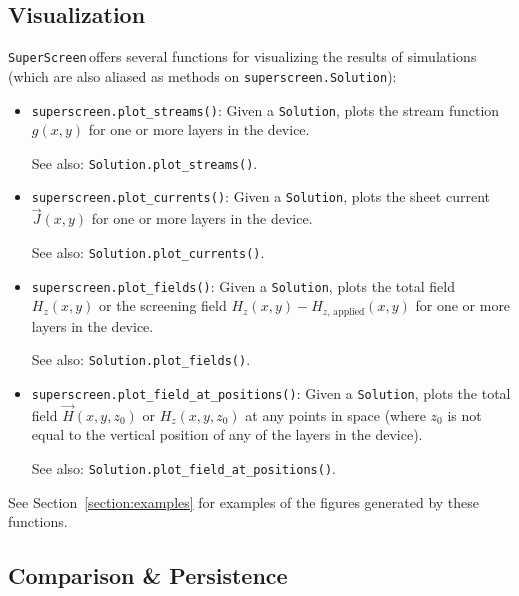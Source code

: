 \documentclass[preprint,12pt]{elsarticle}
\newcommand{\SuperScreen}{\texttt{SuperScreen}\,}
\begin{document}
\subsection{Visualization}
\label{section:overview:visualization}

\SuperScreen offers several functions for visualizing the results of simulations (which are also aliased as methods on \texttt{superscreen.Solution}):

\begin{itemize}
    \item{
    \texttt{superscreen.plot_streams()}: Given a \texttt{Solution}, plots the stream function $g(x, y)$ for one or more layers in the device.
    
    See also: \texttt{Solution.plot_streams()}.
    }
    \item{
    \texttt{superscreen.plot_currents()}: Given a \texttt{Solution}, plots the sheet current $\vec{J}(x, y)$ for one or more layers in the device.
    
    See also: \texttt{Solution.plot_currents()}.
    }
    \item{
    \texttt{superscreen.plot_fields()}: Given a \texttt{Solution}, plots the total field $H_z(x, y)$ or the screening field $H_z(x, y) - H_{z,\,\mathrm{applied}}(x, y)$ for one or more layers in the device.
    
    See also: \texttt{Solution.plot_fields()}.
    }
    \item{
    \texttt{superscreen.plot_field_at_positions()}: Given a \texttt{Solution}, plots the total field $\vec{H}(x, y, z_0)$ or $H_z(x, y, z_0)$ at any points in space (where $z_0$ is not equal to the vertical position of any of the layers in the device).
    
    See also: \texttt{Solution.plot_field_at_positions()}.
    }
\end{itemize}

See Section~\ref{section:examples} for examples of the figures generated by these functions.

\subsection{Comparison \& Persistence}
\label{section:overview:persistence}
\end{document}
